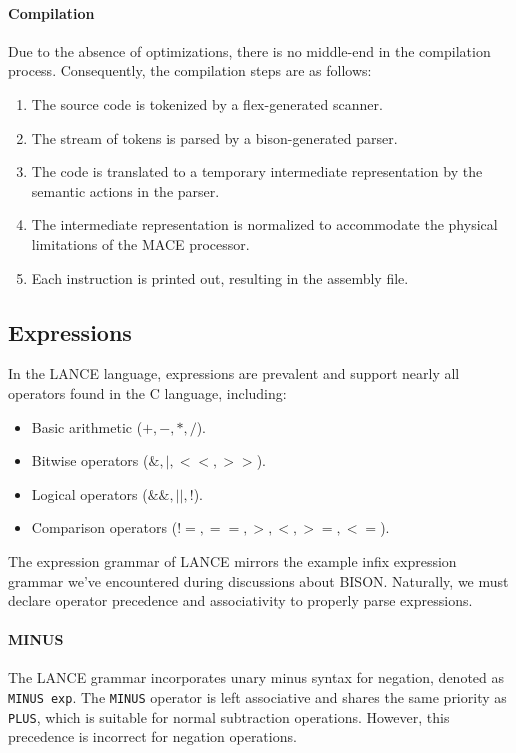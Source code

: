 \paragraph*{Compilation}
Due to the absence of optimizations, there is no middle-end in the compilation process. 
Consequently, the compilation steps are as follows:
\begin{enumerate}
    \item The source code is tokenized by a flex-generated scanner.
    \item The stream of tokens is parsed by a bison-generated parser.
    \item The code is translated to a temporary intermediate representation by the semantic actions in the parser.
    \item The intermediate representation is normalized to accommodate the physical limitations of the MACE processor.
    \item Each instruction is printed out, resulting in the assembly file.
\end{enumerate}

\subsection{Expressions}
In the LANCE language, expressions are prevalent and support nearly all operators found in the C language, including:
\begin{itemize}
    \item Basic arithmetic ($+, -, *, /$).
    \item Bitwise operators ($\&, |, <<, >>$).
    \item Logical operators ($\&\&, ||, !$).
    \item Comparison operators ($!=, ==, >, <, >=, <=$).
\end{itemize}
The expression grammar of LANCE mirrors the example infix expression grammar we've encountered during discussions about BISON.
Naturally, we must declare operator precedence and associativity to properly parse expressions.
\paragraph*{MINUS}
The LANCE grammar incorporates unary minus syntax for negation, denoted as \texttt{MINUS exp}. 
The \texttt{MINUS} operator is left associative and shares the same priority as \texttt{PLUS}, which is suitable for normal subtraction operations. 
However, this precedence is incorrect for negation operations.

